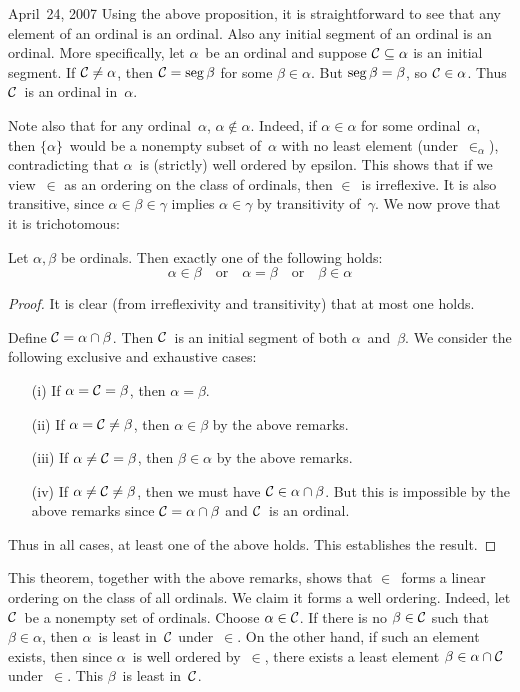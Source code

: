 \begin{lecture}{April~24, 2007}
Using the above proposition, it is straightforward to see that any element of an ordinal is an ordinal. Also any initial segment of an ordinal is an ordinal. More specifically, let \(\alpha\)~be an ordinal and suppose \(\mathcal{C}\subseteq\alpha\) is an initial segment. If \(\mathcal{C}\ne\alpha\), then \(\mathcal{C}=\operatorname{seg}\beta\) for some \(\beta\in\alpha\). But \(\operatorname{seg}\beta=\beta\), so \(\mathcal{C}\in\alpha\). Thus \(\mathcal{C}\)~is an ordinal in~\(\alpha\).

Note also that for any ordinal~\(\alpha\), \(\alpha\not\in\alpha\). Indeed, if \(\alpha\in\alpha\) for some ordinal~\(\alpha\), then \(\{\alpha\}\)~would be a nonempty subset of~\(\alpha\) with no least element (under~\(\in_{\alpha}\)), contradicting that \(\alpha\)~is (strictly) well ordered by epsilon. This shows that if we view~\(\in\) as an ordering on the class of ordinals, then \(\in\)~is irreflexive. It is also transitive, since \(\alpha\in\beta\in\gamma\) implies \(\alpha\in\gamma\) by transitivity of~\(\gamma\). We now prove that it is trichotomous:
\begin{thm}
Let \(\alpha,\beta\) be ordinals. Then exactly one of the following holds:
\[\alpha\in\beta\quad\text{or}\quad \alpha=\beta\quad\text{or}\quad \beta\in\alpha\]
\end{thm}
\begin{proof}
It is clear (from irreflexivity and transitivity) that at most one holds.

Define \(\mathcal{C}=\alpha\cap\beta\). Then \(\mathcal{C}\)~is an initial segment of both \(\alpha\)~and~\(\beta\). We consider the following exclusive and exhaustive cases:
\begin{enumerate}[itemsep=0pt]
\item[(i)] If \(\alpha=\mathcal{C}=\beta\), then \(\alpha=\beta\).
\item[(ii)] If \(\alpha=\mathcal{C}\ne\beta\), then \(\alpha\in\beta\) by the above remarks.
\item[(iii)] If \(\alpha\ne\mathcal{C}=\beta\), then \(\beta\in\alpha\) by the above remarks.
\item[(iv)] If \(\alpha\ne\mathcal{C}\ne\beta\), then we must have \(\mathcal{C}\in\alpha\cap\beta\). But this is impossible by the above remarks since \(\mathcal{C}=\alpha\cap\beta\) and \(\mathcal{C}\)~is an ordinal.
\end{enumerate}
Thus in all cases, at least one of the above holds. This establishes the result.
\end{proof}
\noindent This theorem, together with the above remarks, shows that \(\in\)~forms a linear ordering on the class of all ordinals. We claim it forms a well ordering. Indeed, let \(\mathcal{C}\)~be a nonempty set of ordinals. Choose \(\alpha\in\mathcal{C}\). If there is no \(\beta\in\mathcal{C}\) such that \(\beta\in\alpha\), then \(\alpha\)~is least in~\(\mathcal{C}\) under~\(\in\). On the other hand, if such an element exists, then since \(\alpha\)~is well ordered by~\(\in\), there exists a least element \(\beta\in\alpha\cap\mathcal{C}\) under~\(\in\). This \(\beta\)~is least in~\(\mathcal{C}\).


\end{lecture}
